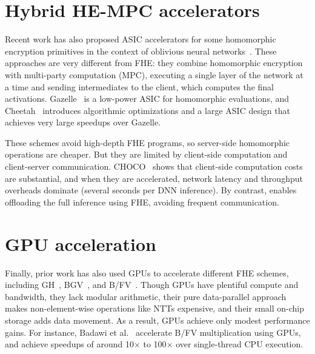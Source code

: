 \section{Hybrid HE-MPC accelerators} \label{sec:mpc}
Recent work has also proposed ASIC accelerators for some homomorphic encryption primitives
in the context of oblivious neural networks~\cite{juvekar2018gazelle,reagen:hpca21:cheetah}.
These approaches are very different from FHE:
they combine homomorphic encryption with multi-party computation (MPC),
executing a single layer of the network at a time and sending intermediates
to the client, which computes the final activations.
Gazelle~\cite{juvekar2018gazelle} is a low-power ASIC for homomorphic evaluations,
and Cheetah~\cite{reagen:hpca21:cheetah} introduces algorithmic optimizations
and a large ASIC design that achieves very large speedups over Gazelle.

These schemes avoid high-depth FHE programs, so server\hyp{}side homomorphic operations are cheaper.
But they are limited by client-side computation and client-server communication.
CHOCO~\cite{vanderhagen:arxiv21:choco} shows that client-side computation costs are substantial,
and when they are accelerated, network latency and throughput overheads dominate
(several seconds per DNN inference).
By contrast, \name enables offloading the full inference using FHE,
avoiding frequent communication.

\section{GPU acceleration}
Finally, prior work has also used GPUs to accelerate different FHE schemes,
including GH~\cite{wang:hpec12:fhe-gpu,wang:tc13:fhe-gpu}, BGV~\cite{wang:iscas14:leveled-gpu},
and B/FV~\cite{al:emerging19:implementation}.
Though GPUs have plentiful compute and bandwidth,
they lack modular arithmetic, their pure data-parallel approach
makes non-element-wise operations like NTTs expensive,
and their small on-chip storage adds data movement.
As a result, GPUs achieve only modest performance gains.
For instance, Badawi et al.~\cite{al:emerging19:implementation}
accelerate B/FV multiplication using GPUs, and achieve speedups of around 10$\times$ to 100$\times$
over single-thread CPU execution.
